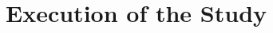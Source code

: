 \documentclass[../UsabilityReport.tex]{subfiles}
\begin{document}
\chapter{Execution of the Study}
\thispagestyle{fancy}
	
	
	
\end{document}
